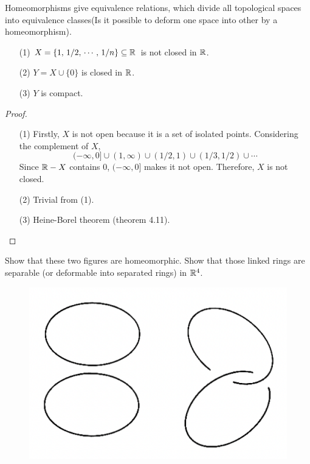 \documentclass[a4paper, 10pt]{article}
\begin{document}
\begin{remark}
    Homeomorphisms give equivalence relations, which divide all topological spaces into equivalence classes(Is it possible to deform one space into other by a homeomorphism).
\end{remark}
\newpage


\begin{exer}
    \hphantom{.}
    \begin{itemize}
        \item[(1)] $X = \{ 1,\, 1/2,\, \cdots,\, 1/n \} \subseteq \mathbb{R}$ is not closed in $\mathbb{R}$.
        \item[(2)] $Y = X \cup \{0\}$ is closed in $\mathbb{R}$.
        \item[(3)] $Y$ is compact.
    \end{itemize}
\end{exer}

\begin{proof}
    \hphantom{.}
    \begin{itemize}
        \item[(1)] Firstly, $X$ is not open because it is a set of isolated points. Considering the complement of $X$,
        \[ (-\infty, 0] \cup (1, \infty) \cup (1/2, 1) \cup (1/3, 1/2) \cup \cdots  \]
        Since $\mathbb{R}-X$ contains  0, $(-\infty, 0]$ makes it not open. Therefore, $X$ is not closed.
        \item[(2)] Trivial from (1).
        \item[(3)] Heine-Borel theorem (theorem 4.11).
    \end{itemize}
\end{proof}

\begin{exer}
    Show that these two figures are homeomorphic. Show that those linked rings are separable (or deformable into separated rings) in $\mathbb{R}^{4}$.
\end{exer}

\begin{figure}[htbp!]
    \centering
    \includegraphics[width=0.3\linewidth]{../images/lecture04/4_01.png}
\end{figure}
\end{document}
